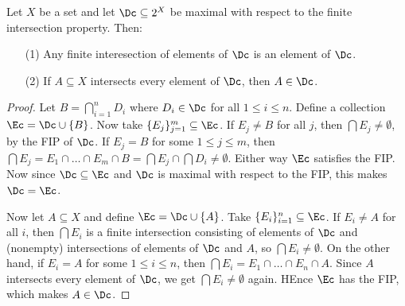 \begin{lemma}\label{3.5.3}
    Let $X$ be a set and let  $\Dc \subseteq 2^X$ be maximal with respect to the finite intersection
    property. Then:
    \begin{enumerate}
        \item[(1)] Any finite interesection of elements of $\Dc$ is an element of  $\Dc$.

        \item [(2)] If $A \subseteq X$ intersects every element of  $\Dc$, then  $A \in \Dc$.
    \end{enumerate}
\end{lemma}
\begin{proof}
    Let $B=\bigcap_{i=1}^n{D_i}$ where $D_i \in \Dc$ for all  $1 \leq i \leq n$. Define a collection
     $\Ec=\Dc \cup \{B\}$. Now take $\{E_j\}_{j=1}^m \subseteq \Ec$. If $E_j \neq B$ for all  $j$,
     then  $\bigcap{E_j} \neq \emptyset$, by the FIP of  $\Dc$. If  $E_j=B$ for some $1 \leq j \leq
     m$, then  $\bigcap{E_j}=E_1 \cap \dots \cap E_m \cap B=\bigcap{E_j} \cap \bigcap{D_i} \neq
     \emptyset$. Either way $\Ec$ satisfies the FIP. Now since  $\Dc \subseteq \Ec$ and  $\Dc$ is
     maximal with respect to the FIP, this makes  $\Dc=\Ec$.

     Now let  $A \subseteq X$ and define  $\Ec=\Dc \cup \{A\}$. Take $\{E_i\}_{i=1}^n \subseteq
     \Ec$. If $E_i \neq A$ for all $i$, then  $\bigcap{E_i}$ is a finite intersection consisting of
     elements of $\Dc$ and  (nonempty) intersections of elements of $\Dc$ and  $A$, so
     $\bigcap{E_i} \neq \emptyset$. On the other hand, if $E_i=A$ for some  $1 \leq i \leq n$, then
      $\bigcap{E_i}=E_1 \cap \dots \cap E_n \cap A$. Since $A$ intersects every element of  $\Dc$,
      we get  $\bigcap{E_i} \neq \emptyset$ again. HEnce $\Ec$ has the FIP, which makes  $A \in
      \Dc$.
\end{proof}

